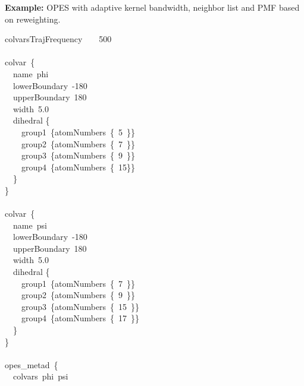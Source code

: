 \noindent\textbf{Example:} OPES with adaptive kernel bandwidth, neighbor list and PMF based on reweighting.\\
\begin{cvexampleinput}
\-colvarsTrajFrequency~~~~500         \\
                                      \\
\-colvar~\{                           \\
\-\-~~name~phi                        \\
\-\-~~lowerBoundary~-180              \\
\-\-~~upperBoundary~180               \\
\-\-~~width~5.0                       \\
\-\-~~dihedral \{                     \\
\-\-~~~~group1~\{atomNumbers~\{~5~\}\}\\
\-\-~~~~group2~\{atomNumbers~\{~7~\}\}\\
\-\-~~~~group3~\{atomNumbers~\{~9~\}\}\\
\-\-~~~~group4~\{atomNumbers~\{~15\}\}\\
\-\-~~\}                              \\
\-\}                                  \\
                                      \\
\-colvar~\{                           \\
\-~~name~psi                          \\
\-~~lowerBoundary~-180                \\
\-~~upperBoundary~180                 \\
\-~~width~5.0                         \\
\-~~dihedral \{                       \\
\-~~~~group1~\{atomNumbers~\{~7~\}\}  \\
\-~~~~group2~\{atomNumbers~\{~9~\}\}  \\
\-~~~~group3~\{atomNumbers~\{~15~\}\} \\
\-~~~~group4~\{atomNumbers~\{~17~\}\} \\
\-~~\}                                \\
\-\}                                  \\
                                      \\
\-opes\_metad~\{                      \\
\-~~colvars~phi~psi                   \\

\end{cvexampleinput}
